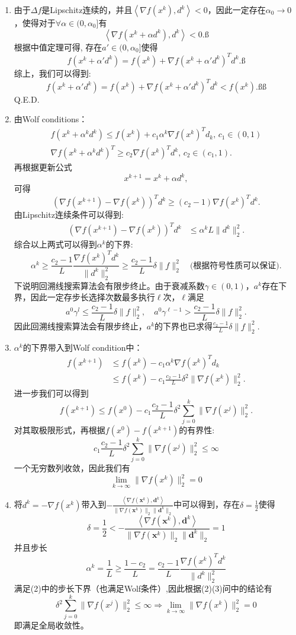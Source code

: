 \documentclass[10pt]{article}
\begin{document}
\begin{enumerate}
	\item 由于$\Delta f$是Lipschitz连续的，并且$\left \langle \nabla f(x^k), d^k \right \rangle <0$，因此一定存在$\alpha_0 \rightarrow 0$，使得对于$\forall \alpha \in (0,\alpha_0]$有
		$$\left \langle \nabla f(x^k+\alpha d^k), d^k \right \rangle < 0.ß$$ 
		根据中值定理可得, 存在$a'\in (0,\alpha_0]$使得$$f(x^k +\alpha' d^k) = f(x^k) + \nabla f(x^k +\alpha'd^k)^Td^k.ß$$
		综上，我们可以得到:
		$$f(x^k +\alpha' d^k) = f(x^k) + \nabla f(x^k +\alpha'd^k)^Td^k < f(x^k).ßß$$
		Q.E.D.
	\item 由Wolf conditions：
	\begin{align*}
		f(x^k + \alpha^k d^k)\le f(x^k) + c_1\alpha^k\nabla f(x^k)^Td_k, \, c_1\in (0,1) \\
		\nabla f(x^k + \alpha^k d^k)^T \ge c_2\nabla f(x^k)^Td^k,\, c_2\in (c_1,1).
	\end{align*}
	再根据更新公式
	$$x ^{k+1} = x^k + \alpha d^k,$$
	可得
	$$(\nabla f(x^{k+1}) - \nabla f(x^k))^Td^k \ge (c_2-1)\nabla f(x^k)^Td^k.$$
	由Lipschitz连续条件可以得到:
	\begin{align*}
		(\nabla f(x^{k+1}) - \nabla f(x^k))^Td^k &\le \alpha^k L\|d^k\|_2^2.
	\end{align*}
	综合以上两式可以得到$\alpha^k$的下界:
	$$\alpha^k \ge \frac{c_2-1}{L} \frac{\nabla f(x^k)^T d^k}{\|d^k\|_2^2}\ge \frac{c_2-1}{L}\delta \| \underbar{f} \|_2^2 \quad\text{(根据符号性质可以保证)}.$$
	下说明回溯线搜索算法会有限步终止。由于衰减系数$\gamma\in (0,1)$，$a^k$存在下界，因此一定存步长选择次数最多执行$\ell$次，$\ell$满足
			$$a^0 \gamma^l \le  \frac{c_2-1}{L}\delta \| \underbar{f} \|_2^2,\quad  a^0 \gamma^{\ell-1} >  \frac{c_2-1}{L}\delta \| \underbar{f} \|_2^2.$$ 
			因此回溯线搜索算法会有限步终止，$a^k$的下界也已求得$ \frac{c_2-1}{L}\delta \| \underbar{f} \|_2^2$.
	\item 
	$\alpha^k$的下界带入到Wolf condition中：
	\begin{align*}
		f(x^{k+1}) &\le f(x^k) - c_1 \alpha^k \nabla f(x^k)^T d_k\\
		&\le f(x^k) - c_1\frac{c_2-1}{L}\delta^2 \| \nabla f(x^k) \|_2^2.
	\end{align*}
	进一步我们可以得到
	$$f(x^{k+1}) \le f(x^{0}) -c_1\frac{c_2-1}{L} \delta^2 \sum_{j=0}^k \|\nabla f(x^j)\|_2^2.$$
	对其取极限形式，再根据$f(x^0)-f(x^{k+1})$的有界性:
		$$c_1\frac{c_2-1}{L} \delta^2 \sum_{j=0}^k \|\nabla f(x^j)\|_2^2 \le \infty$$
		一个无穷数列收敛，因此我们有
		$$\lim_{k\rightarrow \infty} \|\nabla f(x^k)\|_2^2 = 0$$
	\item  将$d^k = -\nabla f(x^k)$带入到$-\frac{\left \langle \nabla f(\bm{x}^k), \bm{d}^k \right \rangle}{\|\nabla f(\bm{x}^k)\|_2\|\bm{d}^k\|_2}$中可以得到，存在$\delta = \frac{1}{2}$使得
	$$\delta = \frac{1}{2} < -\frac{\left \langle \nabla f(\bm{x}^k), \bm{d}^k \right \rangle}{\|\nabla f(\bm{x}^k)\|_2\|\bm{d}^k\|_2} =1$$
	并且步长$$\alpha^k = \frac{1}{L} \ge \frac{1-c_2}{L} = \frac{c_2-1}{L}  \frac{\nabla f(x^k)^T d^k}{\|d^k\|_2^2}$$满足(2)中的步长下界（也满足Wolf条件）,因此根据(2)(3)问中的结论有
	$$ \delta^2 \sum_{j=0}^k \|\nabla f(x^j)\|_2^2 \le \infty\Rightarrow\lim_{k\rightarrow \infty} \|\nabla f(x^k)\|_2^2 = 0$$
	即满足全局收敛性。
\end{enumerate}
\end{document}
